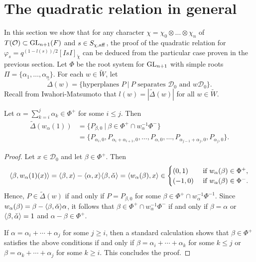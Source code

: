 \section{The quadratic relation in general}

    In this section we show that for any character $\chi=\chi_0\otimes\ldots\otimes\chi_n$ of $T(\mathcal{O})\subset\mathrm{GL}_{n+1}(F)$ and $s\in S_{\chi,\mathrm{aff}}$, the proof of the quadratic relation for $\varphi_s=q^{(1-l(s))/2}[IsI]_{\check{\chi}}$ can be deduced from the particular case proven in the previous section. Let $\Phi$ be the root system for $\mathrm{GL}_{n+1}$ with simple roots $\Pi=\{\alpha_1,\ldots,\alpha_n\}$. For each $w\in\widetilde{W}$, let 
    $$\widetilde{\Delta}(w)=\{\text{hyperplanes }P\ |\ P\text{ separates }\mathcal{D}_0\text{ and }w\mathcal{D}_0\}.$$
    Recall from Iwahori-Matsumoto that $l(w)=|\widetilde{\Delta}(w)|$ for all $w\in\widetilde{W}$.

    \begin{lemma}\label{lem_w1}
        Let $\alpha=\sum_{k=i}^{j}\alpha_k\in\Phi^+$ for some $i\leq j$. Then
        \begin{align*}
            \widetilde{\Delta}(w_\alpha(1))&=\{P_{\beta,0}\ |\ \beta\in\Phi^+\cap w_\alpha^{-1}\Phi^-\}\\
            &=\{P_{\alpha_i,0},P_{\alpha_i+\alpha_{i+1},0},\ldots,P_{\alpha,0},\ldots,P_{\alpha_{j-1}+\alpha_j,0},P_{\alpha_j,0}\}.
        \end{align*}
    \end{lemma}

    \begin{proof}
        Let $x\in\mathcal{D}_0$ and let $\beta\in\Phi^+$. Then
        \begin{equation*}
            \langle\beta,w_\alpha(1)(x)\rangle=\langle\beta,x\rangle-\langle\alpha,x\rangle\langle\beta,\check{\alpha}\rangle=\langle w_\alpha(\beta),x\rangle\in
            \begin{cases}
                (0,1) &\text{ if } w_\alpha(\beta)\in\Phi^+,\\
                (-1,0) &\text{ if } w_\alpha(\beta)\in\Phi^-.
            \end{cases}
        \end{equation*}
        Hence, $P\in\widetilde{\Delta}(w)$ if and only if $P=P_{\beta,0}$ for some $\beta\in\Phi^+\cap w_\alpha^{-1}\Phi^{-1}$. Since $w_\alpha(\beta)=\beta-\langle\beta,\check{\alpha}\rangle\alpha$, it follows that $\beta\in\Phi^+\cap w_\alpha^{-1}\Phi^-$ if and only if $\beta=\alpha$ or $\langle\beta,\check{\alpha}\rangle=1$ and $\alpha-\beta\in\Phi^+$.
        
        If $\alpha=\alpha_i+\cdots+\alpha_j$ for some $j\geq i$, then a standard calculation shows that $\beta\in\Phi^+$ satisfies the above conditions if and only if $\beta=\alpha_i+\cdots+\alpha_k$ for some $k\leq j$ or $\beta=\alpha_k+\cdots+\alpha_j$ for some $k\geq i$. This concludes the proof.
    \end{proof}

